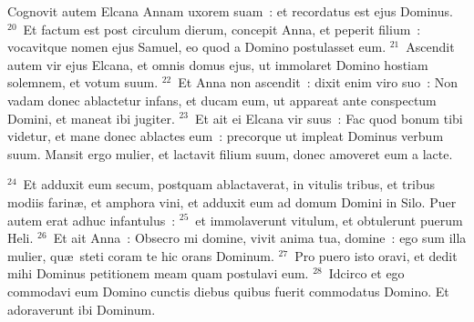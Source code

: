  Cognovit autem Elcana Annam uxorem suam~: et recordatus est ejus Dominus.
${}^{20}$~Et factum est post circulum dierum, concepit Anna, et peperit filium~: vocavitque nomen ejus Samuel, eo quod a Domino postulasset eum.
${}^{21}$~Ascendit autem vir ejus Elcana, et omnis domus ejus, ut immolaret Domino hostiam solemnem, et votum suum.
${}^{22}$~Et Anna non ascendit~: dixit enim viro suo~: Non vadam donec ablactetur infans, et ducam eum, ut appareat ante conspectum Domini, et maneat ibi jugiter.
${}^{23}$~Et ait ei Elcana vir suus~: Fac quod bonum tibi videtur, et mane donec ablactes eum~: precorque ut impleat Dominus verbum suum. Mansit ergo mulier, et lactavit filium suum, donec amoveret eum a lacte.


${}^{24}$~Et adduxit eum secum, postquam ablactaverat, in vitulis tribus, et tribus modiis farin\ae , et amphora vini, et adduxit eum ad domum Domini in Silo. Puer autem erat adhuc infantulus~:
${}^{25}$~et immolaverunt vitulum, et obtulerunt puerum Heli.
${}^{26}$~Et ait Anna~: Obsecro mi domine, vivit anima tua, domine~: ego sum illa mulier, qu\ae\ steti coram te hic orans Dominum.
${}^{27}$~Pro puero isto oravi, et dedit mihi Dominus petitionem meam quam postulavi eum.
${}^{28}$~Idcirco et ego commodavi eum Domino cunctis diebus quibus fuerit commodatus Domino. Et adoraverunt ibi Dominum.

